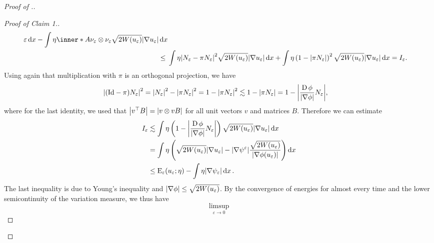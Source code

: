 \begin{proof}[Proof of .]
\begin{proof}[Proof of Claim 1.]
\begin{align*}
{{{						\varepsilon } }
				\dd{ x }
				-
				\int
				\eta
				\inner*{ A }
				{ \nu_{ \varepsilon } \otimes \nu_{ \varepsilon } }
				\sqrt{ 2 W ( u_{ \varepsilon } ) }
				\abs{ \nabla u_{ \varepsilon } }
				\dd{ x }
			}
			\\
			\leq{} & 
			\int
			\eta
			\abs{ N_{ \varepsilon } - \pi N_{ \varepsilon } }^{ 2 }
			\sqrt{ 2 W ( u_{ \varepsilon} ) } \abs{ \nabla u_{ \varepsilon 
			} }
			\dd{ x }
			+
			\int
			\eta
			\left( 
			1 - \abs{ \pi N_{ \varepsilon } }
			\right)^{ 2 }
			\sqrt{ 2 W ( u_{ \varepsilon } ) } \abs{ \nabla u_{ \varepsilon 
			} }
			\dd{ x }= I_{ \varepsilon }.
		\end{align*}
		Using again that multiplication with $ \pi $ is an orthogonal 
		projection, we have
		\begin{align*}
			\abs{
				( \mathrm{Id} - \pi ) N_{ \varepsilon }
			}^{ 2 }
			& =
			\abs{ N_{ \varepsilon } }^{ 2 } 
			-
			\abs{ \pi N_{ \varepsilon } }^{ 2 }
			=
			1 - \abs{ \pi N_{ \varepsilon } }^{ 2 }
			\lesssim
			1 - \abs{ \pi N_{ \varepsilon } }
			=
			1 -
			\abs{ \frac{ \operatorname{D} \phi }{ \abs{ \nabla \phi } } N_{ \varepsilon } 
			},
		\end{align*}
		where for the last identity, we used that $ \abs{ v^{ \top } B } = 
		\abs{ v \otimes v B } $ for all unit vectors $ v $ and matrices $ B $.
		Therefore we can estimate
		\begin{align*}
			I_{ \varepsilon }
			& \lesssim
			\int
			\eta
			\left(
			1 - \abs{ \frac{ \operatorname{D} \phi }{ \abs{ \nabla \phi } } N_{ 
					\varepsilon } }
			\right)
			\sqrt{ 2 W ( u_{ \varepsilon } ) }
			\abs{ \nabla u_{ \varepsilon } }
			\dd{ x }
			\\
			& =
			\int
			\eta 
			\left(
			\sqrt{ 2 W ( u_{ \varepsilon } ) }
			\abs{ \nabla u_{ \varepsilon } }
			-
			\abs{ \nabla \psi^{ \varepsilon } }
			\frac{ \sqrt{ 2 W ( u_{ \varepsilon } ) } }{ \abs{ \nabla 
					\phi ( u_{ \varepsilon } ) } }
			\right)
			\dd{ x }
			\\
			& \leq
			\operatorname{E}_{ \varepsilon } ( u_{ \varepsilon } ; \eta )
			-
			\int
			\eta
			\abs{ \nabla \psi_{ \varepsilon } }
			\dd{ x }.
		\end{align*}
		The last inequality is due to Young's inequality and $ \abs{ \nabla 
			\phi } \leq \sqrt{ 2 W ( u_{ \varepsilon } ) } $.
		By the convergence of energies for almost every time and the lower 
		semicontinuity of the variation measure, we thus have
		\begin{equation*}
			\limsup_{ \varepsilon \to 0 }

\end{equation*}
\end{proof}
\end{proof}
